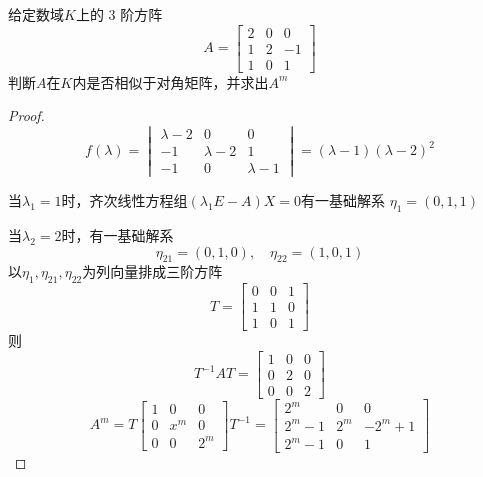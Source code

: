 \documentclass[11pt]{article}
\begin{document}
\begin{proposition}[]
给定数域\(K\)上的 3 阶方阵
\begin{equation*}
A=
\begin{bmatrix}
2&0&0\\1&2&-1\\1&0&1
\end{bmatrix}
\end{equation*}
判断\(A\)在\(K\)内是否相似于对角矩阵，并求出\(A^m\)
\end{proposition}
\begin{proof}
\begin{equation*}
f(\lambda)=
\begin{vmatrix}
\lambda-2&0&0\\-1&\lambda-2&1\\
-1&0&\lambda-1
\end{vmatrix}=(\lambda-1)(\lambda-2)^2
\end{equation*}

当\(\lambda_1=1\)时，齐次线性方程组\((\lambda_1 E-A)X=0\)有一基础解系
\(\eta_1=(0,1,1)\)

当\(\lambda_2=2\)时，有一基础解系
\begin{equation*}
\eta_{21}=(0,1,0),\quad\eta_{22}=(1,0,1)
\end{equation*}
以\(\eta_1,\eta_{21},\eta_{22}\)为列向量排成三阶方阵
\begin{equation*}
T=
\begin{bmatrix}
0&0&1\\1&1&0\\1&0&1
\end{bmatrix}
\end{equation*}
则
\begin{equation*}
T^{-1}AT=
\begin{bmatrix}
1&0&0\\0&2&0\\0&0&2
\end{bmatrix}
\end{equation*}
\begin{equation*}
A^m=T
\begin{bmatrix}
1&0&0\\0&x^m&0\\0&0&2^m
\end{bmatrix}T^{-1}=
\begin{bmatrix}
2^m&0&0\\
2^m-1&2^m&-2^m+1\\
2^m-1&0&1
\end{bmatrix}
\end{equation*}
\end{proof}
\end{document}
